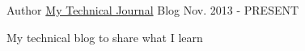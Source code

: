 \begin{cventries}
  \cventry
    {Author}
    {\href{https://yedhukrishnan.blogspot.in/}{My Technical Journal}}
    {Blog}
    {Nov. 2013 - PRESENT}
    {
      \begin{cvitems}
        \item {My technical blog to share what I learn}
      \end{cvitems}
    }
\end{cventries}
